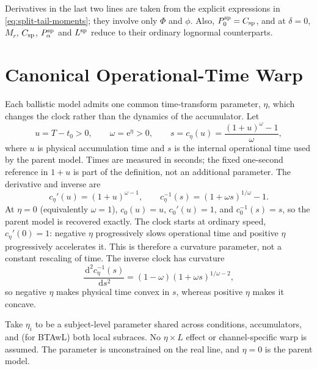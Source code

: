 \documentclass[12pt]{article}
\newcommand{\dd}{\,\mathrm{d}}
\newcommand{\PhiN}{\Phi}
\newcommand{\phiN}{\phi}
\newcommand{\e}{\mathrm{e}}
\theoremstyle{remark}
\begin{document}
Derivatives in the last two lines are taken from the explicit expressions in
\eqref{eq:split-tail-moments}; they involve only $\PhiN$ and $\phiN$. Also,
$P_0^{\rm sp}=C_{\rm sp}$, and at $\delta=0$, $M_r$, $C_{\rm sp}$, $P_\alpha^{\rm sp}$ and $L^{\rm sp}$ reduce to their ordinary lognormal counterparts.

\section{Canonical Operational-Time Warp}
\label{sec:time-warp}
Each ballistic model admits one common time-transform parameter, \(\eta\), which changes the clock rather than the dynamics of the accumulator. Let
\begin{equation}
  u=T-t_0>0,
  \qquad
  \omega=\e^{\eta}>0,
  \qquad
  s=c_\eta(u)=\frac{(1+u)^\omega-1}{\omega},
  \label{eq:time-warp-forward}
\end{equation}
where \(u\) is physical accumulation time and \(s\) is the internal operational time used by the parent model. Times are measured in seconds; the fixed one-second reference in \(1+u\) is part of the definition, not an additional parameter. The derivative and inverse are
\begin{equation}
  c_\eta'(u)=(1+u)^{\omega-1},
  \qquad
  c_\eta^{-1}(s)=(1+\omega s)^{1/\omega}-1.
  \label{eq:time-warp-jacobian}
\end{equation}
At \(\eta=0\) (equivalently \(\omega=1\)), \(c_0(u)=u\), \(c_0'(u)=1\), and \(c_0^{-1}(s)=s\), so the parent model is recovered exactly. The clock starts at ordinary speed, \(c_\eta'(0)=1\): negative \(\eta\) progressively slows operational time and positive \(\eta\) progressively accelerates it. This is therefore a curvature parameter, not a constant rescaling of time. The inverse clock has curvature
\begin{equation}
  \frac{\dd^2 c_\eta^{-1}(s)}{\dd s^2}
  =(1-\omega)(1+\omega s)^{1/\omega-2},
  \label{eq:time-warp-curvature}
\end{equation}
so negative \(\eta\) makes physical time convex in $s$, whereas positive \(\eta\) makes it concave.

Take \(\eta_i\) to be a subject-level parameter shared across conditions, accumulators, and (for BTAwL) both local subraces. No \(\eta\times L\) effect or channel-specific warp is assumed. The parameter is unconstrained on the real line, and \(\eta=0\) is the parent model.
\end{document}
